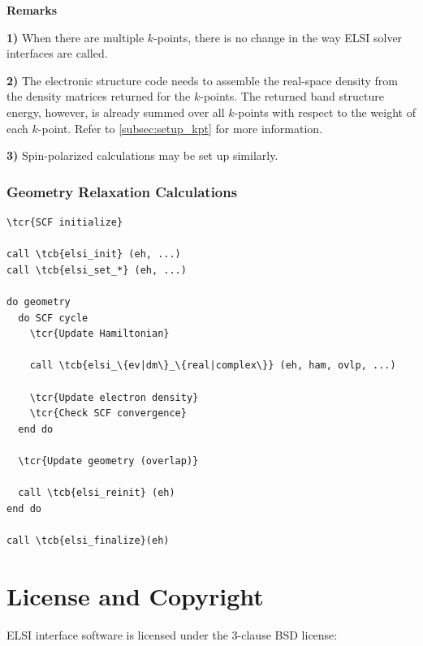 \documentclass{report}
\newcommand{\tcb}[1]{\textcolor{blue}{#1}}
\newcommand{\tcr}[1]{\textcolor{red}{#1}}
\begin{document}
\textbf{Remarks}

\textbf{1)} When there are multiple $k$-points, there is no change in the way ELSI solver interfaces are called.

\textbf{2)} The electronic structure code needs to assemble the real-space density from the density matrices returned for the $k$-points. The returned band structure energy, however, is already summed over all $k$-points with respect to the weight of each $k$-point. Refer to \ref{subsec:setup_kpt} for more information.

\textbf{3)} Spin-polarized calculations may be set up similarly.

\subsection*{Geometry Relaxation Calculations}
\begin{tcolorbox}
\begin{Verbatim}[commandchars=\\\{\}]
\tcr{SCF initialize}

call \tcb{elsi_init} (eh, ...)
call \tcb{elsi_set_*} (eh, ...)

do geometry
  do SCF cycle
    \tcr{Update Hamiltonian}

    call \tcb{elsi_\{ev|dm\}_\{real|complex\}} (eh, ham, ovlp, ...)

    \tcr{Update electron density}
    \tcr{Check SCF convergence}
  end do

  \tcr{Update geometry (overlap)}

  call \tcb{elsi_reinit} (eh)
end do

call \tcb{elsi_finalize}(eh)
\end{Verbatim}
\end{tcolorbox}




\chapter*{License and Copyright}
ELSI interface software is licensed under the 3-clause BSD license:
\end{document}
